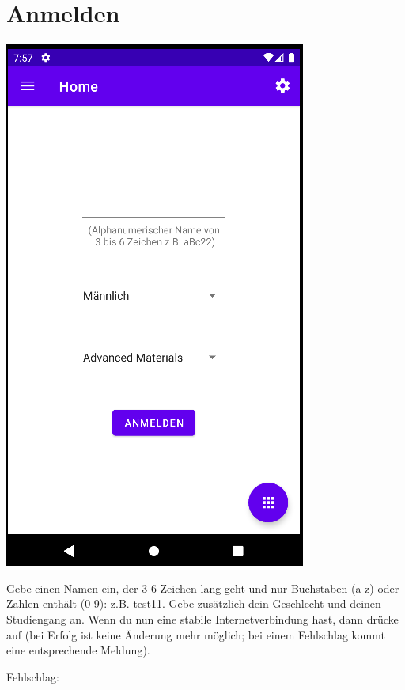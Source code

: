 \documentclass[ngerman]{tutorial}
\begin{document}
\section{Anmelden}
\begin{center}
    \includegraphics[scale=0.5]{start_reg.png}
\end{center}
Gebe einen Namen ein, der 3-6 Zeichen lang geht und nur Buchstaben (a-z) oder Zahlen enthält (0-9): z.B. test11. Gebe zusätzlich dein Geschlecht und deinen Studiengang an. Wenn du nun eine stabile Internetverbindung hast, dann drücke auf  (bei Erfolg ist keine Änderung mehr möglich; bei einem Fehlschlag kommt eine entsprechende Meldung).
\newpage
\begin{center}
    Fehlschlag:
\end{center}
\end{document}
